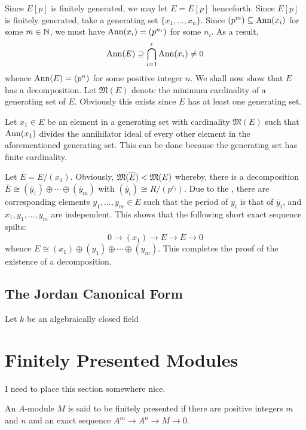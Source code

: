 Since $E[p]$ is finitely generated, we may let $E = E[p]$ henceforth. Since $E[p]$ is finitely generated, take a generating set $\{x_1,\ldots,x_n\}$. Since $(p^m)\subseteq\operatorname{Ann}(x_i)$ for some $m\in\mathbb{N}$, we must have $\operatorname{Ann}(x_i) = (p^{n_i})$ for some $n_i$. As a result, 
\begin{equation*}
    \operatorname{Ann}(E)\supseteq\bigcap_{i = 1}^r\operatorname{Ann}(x_i)\ne 0
\end{equation*}
whence $\operatorname{Ann}(E) = (p^{n})$ for some positive integer $n$. We shall now show that $E$ has a decomposition. Let $\mathfrak M(E)$ denote the minimum cardinality of a generating set of $E$. Obviously this exists since $E$ has at least one generating set.

Let $x_1\in E$ be an element in a generating set with cardinality $\mathfrak M(E)$ such that $\operatorname{Ann}(x_1)$ divides the annihilator ideal of every other element in the aforementioned generating set. This can be done because the generating set has finite cardinality. 

Let $\overline E = E/(x_1)$. Obviously, $\mathfrak{M}(\overline E) < \mathfrak{M}(E)$ whereby, there is a decomposition $\overline E\cong (\overline y_1)\oplus\cdots\oplus(\overline y_m)$ with $(\overline y_i)\cong R/(p^{r_i})$. Due to the , there are corresponding elements $y_1,\ldots,y_m\in E$ such that the period of $y_i$ is that of $\overline y_i$, and $x_1,y_1,\ldots,y_m$ are independent. This shows that the following short exact sequence spilts: 
\begin{equation*}
    0\rightarrow(x_1)\rightarrow E\rightarrow\overline E\rightarrow 0
\end{equation*}
whence $E\cong(x_1)\oplus(y_1)\oplus\cdots\oplus(y_m)$. This completes the proof of the existence of a decomposition.

\subsection{The Jordan Canonical Form}

Let $k$ be an algebraically closed field 

\section{Finitely Presented Modules}

I need to place this section somewhere nice.

\begin{definition}
    An $A$-module $M$ is said to be finitely presented if there are positive integers $m$ and $n$ and an exact sequence $A^m\rightarrow A^n\rightarrow M\rightarrow 0$.
\end{definition}

